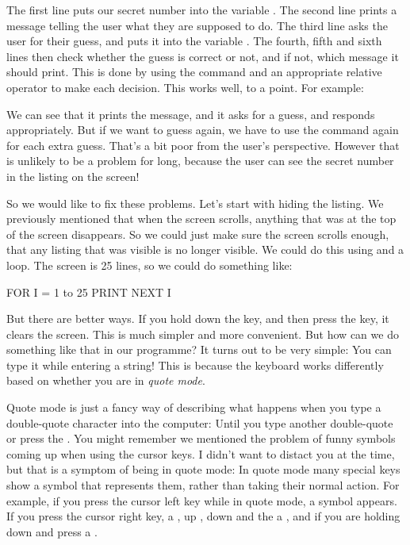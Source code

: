 \needspace{4cm}
The first line puts our secret number into the variable .
The second line prints a message telling the user what they are
supposed to do. The third line asks the user for their guess, and puts
it into the variable . The
fourth, fifth and sixth lines then check whether the guess is correct
or not, and if not, which message it should print. This is done by
using the  command and an appropriate relative operator to
make each decision.  This works well, to a point. For example:


We can see that it prints the message, and it asks for a guess, and
responds appropriately. But if we want to guess again, we have to use
the  command again for each extra guess. That's a bit poor
from the user's perspective. However that is unlikely to be a problem
for long, because the user can see the secret number in the listing on
the screen!

So we would like to fix these problems.  Let's start with hiding the
listing.  We previously mentioned that when the screen scrolls,
anything that was at the top of the screen disappears.  So we could
just make sure the screen scrolls enough, that any listing that was
visible is no longer visible. We could do this using  and a
 loop.  The screen is 25 lines, so we could do something
like:

\begin{screenoutput}
FOR I = 1 to 25
PRINT
NEXT I
\end{screenoutput}

But there are better ways.  If you hold down the 
key, and then press the  key, it clears the
screen.  This is much simpler and more convenient. But how can we do
something like that in our programme?  It turns out to be very simple:
You can type it while entering a string!  This is because the keyboard
works differently based on whether you are in {\em quote
  mode}.

Quote mode is just a fancy way of
describing what happens when you type a double-quote character into
the computer: Until you type another double-quote or press the
.  You might remember we mentioned the problem of
funny symbols coming up when using the cursor keys.  I didn't want to
distact you at the time, but that is a symptom of being in quote mode:
In quote mode many special keys show a symbol that represents them,
rather than taking their normal action.  For example, if you press the
cursor left key while in quote mode, a  symbol appears. If you
press the cursor right key, a , up , down  and the
 a , and if you are holding down
 and press  a .

